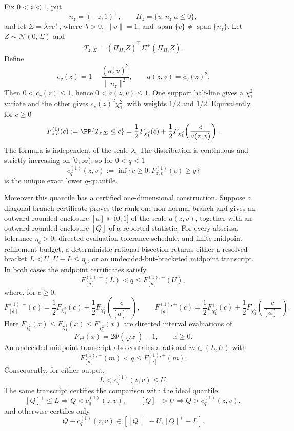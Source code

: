 \begin{lemma}\label{lem:certified-rank-one-nonnormal-projected-gaussian-quantile-main}
Fix \(0<z<1\), put
\[
n_z=(-z,1)^\top,\qquad H_z=\{u:n_z^\top u\le0\},
\]
and let \(\Sigma=\lambda vv^\top\), where \(\lambda>0\),
\(\|v\|=1\), and
\(\operatorname{span}\{v\}\ne\operatorname{span}\{n_z\}\).  Let
\(Z\sim\mathcal N(0,\Sigma)\) and
\[
T_{z,\Sigma}
=(\Pi_{H_z}Z)^\top\Sigma^+(\Pi_{H_z}Z).
\]
Define
\begin{equation}\label{eq:rank-one-nonnormal-scale-main}
c_v(z)=1-\frac{(n_z^\top v)^2}{\|n_z\|^2},
\qquad
a(z,v)=c_v(z)^2 .
\end{equation}
Then \(0<c_v(z)\le1\), hence \(0<a(z,v)\le1\).  One support half-line gives a
\(\chi^2_1\) variate and the other gives \(c_v(z)^2\chi^2_1\), with weights
\(1/2\) and \(1/2\).  Equivalently, for \(c\ge0\)
\begin{equation}\label{eq:rank-one-nonnormal-cdf-main}
F^{(1)}_{z,v}(c)
:=\PP\{T_{z,\Sigma}\le c\}
=\frac12F_{\chi^2_1}(c)
 +\frac12F_{\chi^2_1}\!\left(\frac{c}{a(z,v)}\right).
\end{equation}
The formula is independent of the scale \(\lambda\).  The distribution is
continuous and strictly increasing on \([0,\infty)\), so for \(0<q<1\)
\[
c^{(1)}_q(z,v):=\inf\{c\ge0:F^{(1)}_{z,v}(c)\ge q\}
\]
is the unique exact lower \(q\)-quantile.

Moreover this quantile has a certified one-dimensional construction.  Suppose
a diagonal branch certificate proves the rank-one non-normal branch and gives
an outward-rounded enclosure \([a]\Subset(0,1]\) of the scale
\(a(z,v)\), together with an outward-rounded enclosure \([Q]\) of a reported
statistic.  For every abscissa tolerance \(\eta_c>0\), directed-evaluation
tolerance schedule, and finite midpoint refinement budget, a deterministic
rational bisection returns either a resolved bracket \(L<U\), \(U-L\le\eta_c\),
or an undecided-but-bracketed midpoint transcript.  In both cases the endpoint
certificates satisfy
\[
F^{(1),+}_{[a]}(L)<q\le F^{(1),-}_{[a]}(U),
\]
where, for \(c\ge0\),
\[
F^{(1),-}_{[a]}(c)
=\frac12F_{\chi^2_1}^{-}(c)
 +\frac12F_{\chi^2_1}^{-}\!\left(\frac{c}{[a]^+}\right),
\qquad
F^{(1),+}_{[a]}(c)
=\frac12F_{\chi^2_1}^{+}(c)
 +\frac12F_{\chi^2_1}^{+}\!\left(\frac{c}{[a]^-}\right).
\]
Here \(F_{\chi^2_1}^{-}(x)\le F_{\chi^2_1}(x)\le
F_{\chi^2_1}^{+}(x)\) are directed interval evaluations of
\[
F_{\chi^2_1}(x)=2\Phi(\sqrt x)-1,\qquad x\ge0 .
\]
An undecided midpoint transcript also contains a rational \(m\in(L,U)\) with
\[
F^{(1),-}_{[a]}(m)<q\le F^{(1),+}_{[a]}(m).
\]
Consequently, for either output,
\[
L<c^{(1)}_q(z,v)\le U.
\]
The same transcript certifies the comparison with the ideal quantile:
\[
[Q]^+\le L\Rightarrow Q<c^{(1)}_q(z,v),\qquad
[Q]^->U\Rightarrow Q>c^{(1)}_q(z,v),
\]
and otherwise certifies only
\[
Q-c^{(1)}_q(z,v)\in[[Q]^--U,[Q]^+-L].
\]
\end{lemma}

